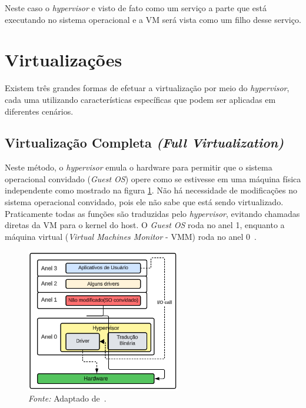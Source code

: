 Neste caso o \textit{hypervisor} e visto de fato como um serviço a parte que está executando no sistema operacional e a VM será vista como um filho desse serviço.


\section{Virtualizações}

Existem três grandes formas de efetuar a virtualização por meio do \textit{hypervisor}, cada uma utilizando características específicas que podem ser aplicadas em diferentes cenários.

\subsection{Virtualização Completa \textit{(Full Virtualization)}}

Neste método, o \textit{hypervisor} emula o hardware para permitir que o sistema operacional convidado (\textit{Guest OS}) opere como se estivesse em uma máquina física independente como mostrado na figura \ref{fig:full_virtualization_rings}. Não há necessidade de modificações no sistema operacional convidado, pois ele não sabe que está sendo virtualizado. Praticamente todas as funções são traduzidas pelo \textit{hypervisor}, evitando chamadas diretas da VM para o kernel do host. O \textit{Guest OS} roda no anel 1, enquanto a máquina virtual (\textit{Virtual Machines Monitor} - VMM) roda no anel 0~\citep{chirammal2016mastering}.

\begin{figure}[htbp]
  \centering
  \caption{Virtualização completa nos anéis de segurança. A figura demonstra o \textit{Guest OS} operando no anel 1 e o VMM no anel 0, com o \textit{hypervisor} realizando a emulação.}
  \includegraphics[width=0.6\textwidth]{images/full_virtualization_rings.png}
  \caption*{\textit{Fonte:} Adaptado de~\citep{chirammal2016mastering}.}
  \label{fig:full_virtualization_rings}
\end{figure}


